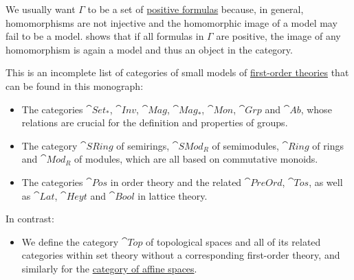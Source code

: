 \begin{remark}\label{rem:positive_formulas_in_category_of_models}
  We usually want \( \Gamma \) to be a set of \hyperref[def:positive_formula]{positive formulas} because, in general, homomorphisms are not injective and the homomorphic image of a model may fail to be a model.  shows that if all formulas in \( \Gamma \) are positive, the image of any homomorphism is again a model and thus an object in the category.
\end{remark}

\begin{example}\label{ex:def:category_of_small_first_order_models}
  This is an incomplete list of categories of small models of \hyperref[def:first_order_theory]{first-order theories} that can be found in this monograph:
  \begin{itemize}
    \item The categories \hyperref[def:pointed_set/category]{\( \cat{Set_*} \)}, \hyperref[def:set_with_involution/category]{\( \cat{Inv} \)}, \hyperref[def:semigroup/category]{\( \cat{Mag} \)}, \hyperref[def:monoid/category]{\( \cat{Mag}_* \)}, \hyperref[def:monoid]{\( \cat{Mon} \)}, \hyperref[def:group/category]{\( \cat{Grp} \)} and \hyperref[def:abelian_group]{\( \cat{Ab} \)}, whose relations are crucial for the definition and properties of groups.

    \item The category \hyperref[def:semiring/category]{\( \cat{SRing} \)} of semirings, \hyperref[def:semimodule]{\( \cat{SMod}_R \)} of semimodules, \hyperref[def:ring/category]{\( \cat{Ring} \)} of rings and \hyperref[def:module/category]{\( \cat{Mod}_R \)} of modules, which are all based on commutative monoids.

    \item The categories \hyperref[def:partially_ordered_set]{\( \cat{Pos} \)} in order theory and the related \hyperref[def:preordered_set/category]{\( \cat{PreOrd} \)}, \hyperref[def:totally_ordered_set]{\( \cat{Tos} \)}, as well as \hyperref[def:lattice/category]{\( \cat{Lat} \)}, \hyperref[def:heyting_algebra/category]{\( \cat{Heyt} \)} and \hyperref[def:boolean_algebra/category]{\( \cat{Bool} \)} in lattice theory.
  \end{itemize}

  In contrast:
  \begin{itemize}
    \item We define the category \hyperref[def:category_of_small_topological_spaces]{\( \cat{Top} \)}  of topological spaces and all of its related categories within set theory without a corresponding first-order theory, and similarly for the \hyperref[def:category_of_small_affine_spaces]{category of affine spaces}.


\end{itemize}
\end{example}
